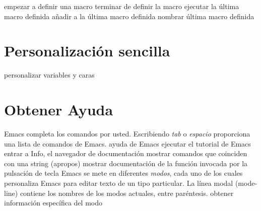  empezar a definir una macro
 terminar de definir la macro
 ejecutar la {\'u}ltima macro definida
 a{\~n}adir a la {\'u}ltima macro definida
 nombrar {\'u}ltima macro definida

\section{Personalizaci{\'o}n sencilla}

 personalizar variables y caras

\section{Obtener Ayuda}

Emacs completa los comandos por usted.  Escribiendo 
{\it tab\/} o {\it espacio\/} proporciona una lista de comandos de Emacs.
\askip
{} ayuda de Emacs
 ejecutar el tutorial de Emacs
 entrar a Info, el navegador de documentaci{\'o}n
 mostrar comandos que coinciden con una string (apropos)
 mostrar documentaci{\'o}n de la funci{\'o}n invocada por la
  pulsaci{\'o}n de tecla
\askip
Emacs se mete en diferentes {\it modos}, cada uno de los cuales personaliza
Emacs para editar texto de un tipo particular.  La l{\'i}nea modal (mode-line)
contiene los nombres de los modos actuales, entre par{\'e}ntesis.
\askip
{} obtener informaci{\'o}n espec{\'i}fica del modo

\copyrightnotice

\bye

